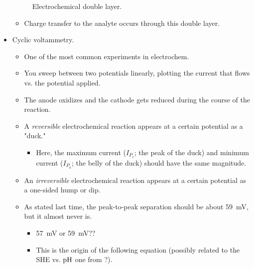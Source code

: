 \documentclass[../notes.tex]{subfiles}
\begin{document}
\begin{itemize}
\begin{figure}[h!]
        \caption{Electrochemical double layer.}
        \label{fig:echem2layer}
    \end{figure}
    \begin{itemize}
        \item Charge transfer to the analyte occurs through this double layer.
    \end{itemize}
    \item Cyclic voltammetry.
    \begin{itemize}
        \item One of the most common experiments in electrochem.
        \item You sweep between two potentials linearly, plotting the current that flows vs. the potential applied.
        \item The anode oxidizes and the cathode gets reduced during the course of the reaction.
        \item A \emph{reversible} electrochemical reaction appears at a certain potential as a "duck."
        \begin{itemize}
            \item Here, the maximum current ($I_{P_c}$; the peak of the duck) and minimum current ($I_{P_a}$; the belly of the duck) should have the same magnitude.
        \end{itemize}
        \item An \emph{irreversible} electrochemical reaction appears at a certain potential as a one-sided hump or dip.
        \item As stated last time, the peak-to-peak separation should be about \SI{59}{\milli\volt}, but it almost never is.
        \begin{itemize}
            \item \SI{57}{\milli\volt} or \SI{59}{\milli\volt}??
            \item This is the origin of the following equation (possibly related to the SHE vs. $\operatorname{pH}$ one from \textcite{bib:CHEM26700Notes}?).
            \begin{equation*}

\end{equation*}
\end{itemize}
\end{itemize}
\end{itemize}
\end{document}
